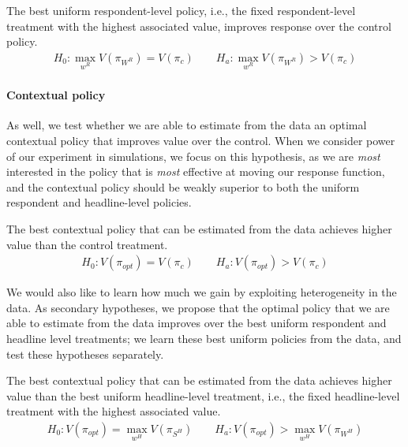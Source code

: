 \documentclass[letterpaper, 12pt, parskip=full,DIV=10]{scrartcl}
\begin{document}
  \begin{subhyp}
  The best uniform respondent-level policy, i.e., the fixed respondent-level treatment with the highest associated value, improves response over the control policy. 
  \label{eq:respondentctr}
\begin{align}
  H_{0}: \max_{w^R} V(\pi_{W^R}) = V(\pi_{c}) \qquad H_{a}:  \max_{w^R} V(\pi_{W^R}) > V(\pi_{c})
\end{align}
\end{subhyp}

\paragraph{Contextual policy}
As well, we test whether we are able to estimate from the data an optimal contextual policy that improves value over the control. When we consider power of our experiment in simulations, we focus on this hypothesis, as we are \textit{most} interested in the policy that is \textit{most} effective at moving our response function, and the contextual policy should be weakly superior to both the uniform respondent and headline-level policies. 
  \begin{hypothesis}
  The best contextual policy that can be estimated from the data achieves higher value than the control treatment. \label{eq:optctr}
\begin{align}
  H_{0}: V(\pi_{opt}) = V(\pi_{c}) \qquad H_{a}:  V(\pi_{opt}) > V(\pi_{c})
\end{align}
\end{hypothesis}

We would also like to learn how much we gain by exploiting heterogeneity in the data. As secondary hypotheses, we propose that the optimal policy that we are able to estimate from the data improves over the best uniform respondent and headline level treatments; we learn these best uniform policies from the data, and test these hypotheses separately. 
\setcounter{hypothesis}{2}
  \begin{subhyp}
  The best contextual policy that can be estimated from the data achieves higher value than the best uniform headline-level treatment, i.e., the fixed headline-level treatment with the highest associated value. 
  \label{eq:optheadline}
\begin{align}
  H_{0}: V(\pi_{opt}) = \max_{w^H} V(\pi_{S^H}) \qquad H_{a}:  V(\pi_{opt}) > \max_{w^H} V(\pi_{W^H})
\end{align}
\end{subhyp}
\end{document}
